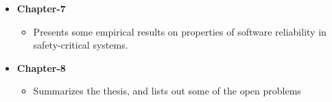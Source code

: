\begin{itemize}
\begin{itemize}
\item  {\bf Chapter-7} 
\begin{itemize}
\item Presents some empirical results on properties of software reliability in safety-critical systems.
\end{itemize}
\end{itemize}
\begin{itemize}
\item  {\bf Chapter-8} 

\begin{itemize}
\item Summarizes the thesis, and lists out some of the open problems
\end{itemize}

\end{itemize}
\end{itemize}
\ifx\mythesis\undefined
\Clearpage
\fi
